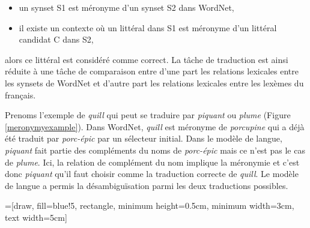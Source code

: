 \begin{itemize}
    \item un synset S1 est méronyme d'un synset S2 dans WordNet,
    \item il existe un contexte où un littéral dans S1 est méronyme d'un littéral candidat C dans S2,
\end{itemize}
alors ce littéral est considéré comme correct. La tâche de traduction est ainsi réduite à une tâche de comparaison entre d'une part les relations lexicales entre les synsets de WordNet et d'autre part les relations lexicales entre les lexèmes du français.

Prenoms l'exemple de \textit{quill} qui peut se traduire par \textit{piquant} ou \textit{plume} (Figure \ref{meronymyexample}). Dans WordNet, \textit{quill} est méronyme de \textit{porcupine} qui a déjà été traduit par \textit{porc-épic} par un sélecteur initial. Dans le modèle de langue, \textit{piquant} fait partie des compléments du noms de \textit{porc-épic} mais ce n'est pas le cas de \textit{plume}. Ici, la relation de complément du nom implique la méronymie et c'est donc \textit{piquant} qu'il faut choisir comme la traduction correcte de \textit{quill}. Le modèle de langue a permis la désambiguïsation parmi les deux traductions possibles.

=[draw, fill=blue!5, rectangle, minimum height=0.5cm, minimum width=3cm, text width=5cm]

